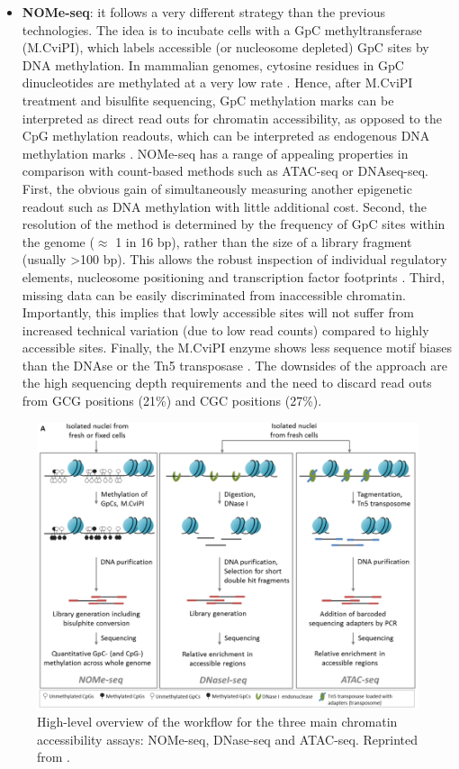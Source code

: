 \begin{itemize}
	\item \textbf{NOMe-seq}: it follows a very different strategy than the previous technologies. The idea is to incubate cells with a GpC methyltransferase (M.CviPI), which labels accessible (or nucleosome depleted) GpC sites by DNA methylation. In mammalian genomes, cytosine residues in GpC dinucleotides are methylated at a very low rate \cite{Kilgore2007}. Hence, after M.CviPI treatment and bisulfite sequencing, GpC methylation marks can be interpreted as direct read outs for chromatin accessibility, as opposed to the CpG methylation readouts, which can be interpreted as endogenous DNA methylation marks \cite{Kelly2012}.
	NOMe-seq has a range of appealing properties in comparison with count-based methods such as ATAC-seq or DNAseq-seq. First, the obvious gain of simultaneously measuring another epigenetic readout such as DNA methylation with little additional cost. Second, the resolution of the method is determined by the frequency of GpC sites within the genome ($\approx$ 1 in 16 bp), rather than the size of a library fragment (usually >100 bp). This allows the robust inspection of individual regulatory elements, nucleosome positioning and transcription factor footprints \cite{Kelly2012,Pott2016,Nordstrom2019}. Third, missing data can be easily discriminated from inaccessible chromatin. Importantly, this implies that lowly accessible sites will not suffer from increased technical variation (due to low read counts) compared to highly accessible sites. Finally, the M.CviPI enzyme shows less sequence motif biases than the DNAse or the Tn5 transposase \cite{Nordstrom2019}.
	The downsides of the approach are the high sequencing depth requirements and the need to discard read outs from GCG positions (21\%) and CGC positions (27\%).	

\end{itemize}



\begin{figure}[H]
	\centering
	\includegraphics[width=0.9\linewidth]{ChromatinAcc_protocols}
	\caption[]{High-level overview of the workflow for the three main chromatin accessibility assays: NOMe-seq, DNase-seq and ATAC-seq. Reprinted from \cite{Nordstrom2019}. }
	\label{fig:ChromatinAcc_protocols}
\end{figure}

